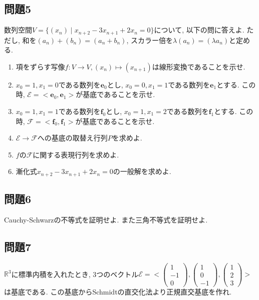 \documentclass[a4j,dvipdfmx]{jsarticle}
\newcommand{\R}{\mathbb{R}}
\newcommand{\E}{\mathcal{E}}
\newcommand{\F}{\mathcal{F}}
\begin{document}
    \subsection*{問題5}
        数列空間$V=\{(x_n)\mid x_{n+2}-3x_{n+1}+2x_{n}=0\}$について, 以下の問に答えよ. ただし, 和を$(a_n)+(b_n)=(a_n+b_n)$, スカラー倍を$\lambda (a_n)=(\lambda a_n)$と定める.
        \begin{enumerate}
            \item 項をずらす写像$f:V\to V,(x_{n})\mapsto (x_{n+1})$は線形変換であることを示せ.
            \item $x_0=1,x_1=0$である数列を$\bm{e}_0$とし, $x_0=0,x_1=1$である数列を$\bm{e}_1$とする. この時, $\E=<\bm{e}_0,\bm{e}_1>$が基底であることを示せ.
            \item $x_0=1,x_1=1$である数列を$\bm{f}_0$とし, $x_0=1,x_1=2$である数列を$\bm{f}_1$とする. この時, $\F=<\bm{f}_0,\bm{f}_1>$が基底であることを示せ.
            \item $\E\to\F$への基底の取替え行列$P$を求めよ.
            \item $f$の$\F$に関する表現行列を求めよ.
            \item 漸化式$x_{n+2}-3x_{n+1}+2x_{n}=0$の一般解を求めよ.
        \end{enumerate}
    \clearpage
    \subsection*{問題6}
        Cauchy-Schwarzの不等式を証明せよ. また三角不等式を証明せよ.
    \subsection*{問題7}
        $\R^3$に標準内積を入れたとき, 3つのベクトル$\E = < \begin{pmatrix}1 \\ -1 \\ 0\end{pmatrix},\begin{pmatrix}1 \\ 0 \\ -1\end{pmatrix},\begin{pmatrix}1 \\ 2 \\ 3\end{pmatrix}>$は基底である. この基底からSchmidtの直交化法より正規直交基底を作れ.
\end{document}
